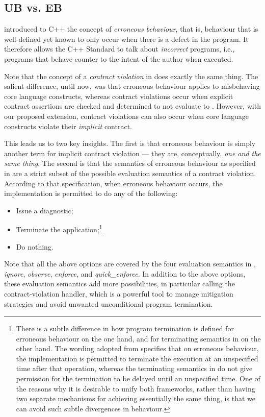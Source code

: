 \subsection{UB vs. EB}
\label{erroneous}

\cite{P2795R5} introduced to C++ the concept of \emph{erroneous behaviour}, that is, behaviour that is well-defined yet known to only occur when there is a defect in the program. It therefore allows the C++ Standard to talk about \emph{incorrect} programs, i.e., programs that behave counter to the intent of the author when executed.

Note that the concept of a \emph{contract violation} in \cite{P2900R9} does exactly the same thing. The salient difference, until now, was that erroneous behaviour applies to misbehaving core language constructs, whereas contract violations occur when  explicit contract assertions are checked and determined to not evaluate to . However, with our proposed extension, contract violations can also occur when core language constructs violate their \emph{implicit} contract. 

This leads us to two key insights. The first is that erroneous behaviour is simply another term for implicit contract violation --- they are, conceptually, \emph{one and the same thing}. The second is that the semantics of erroneous behaviour as specified in \cite{P2795R5} are a strict subset of the possible evaluation semantics of a contract violation. According to that specification, when erroneous behaviour occurs, the implementation is permitted to do any of the following:
\begin{itemize}
\item Issue a diagnostic;
\item Terminate the application;\footnote{There is a subtle difference in how program termination is defined for erroneous behaviour on the one hand, and for terminating semantics in \cite{P2900R9} on the other hand. The wording adopted from \cite{P2795R5} specifies that on erroneous behaviour, the implementation is permitted to terminate the execution at an unspecified time after that operation, whereas the terminating semantics in \cite{P2900R9} do not give permission for the termination to be delayed until an unspecified time. One of the reasons why it is desirable to unify both frameworks, rather than having two separate mechanisms for achieving essentially the same thing, is that we can avoid such subtle divergences in behaviour.}
\item Do nothing.
\end{itemize}
Note that all the above options are covered by the four evaluation semantics in \cite{P2900R9}, \emph{ignore}, \emph{observe}, \emph{enforce}, and \emph{quick_enforce}. In addition to the above options, these evaluation semantics add more possibilities, in particular calling the contract-violation handler, which is a powerful tool to manage mitigation strategies and avoid unwanted unconditional program termination.

